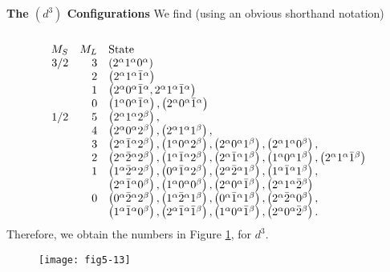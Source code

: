 {\bf The $(d^3)$ Configurations}
We find (using an obvious shorthand notation)
\begin{equation}
\begin{array}{rrl}\\
M_S & M_L & \mathrm{State} \\
3/2 & 3 & \left( 2^{\alpha} 1^{\alpha} 0^{\alpha} \right)\cr
& 2 & \left( 2^{\alpha} 1^{\alpha} {\bar{1}}^{\alpha} \right)\cr
& 1 & \left( 2^{\alpha} 0^{\alpha} {\bar{1}}^{\alpha} , 2^{\alpha} 
1^{\alpha} {\bar{1}}^{\alpha} \right)\cr
& 0 & \left( 1^{\alpha} 0^{\alpha} {\bar{1}}^{\alpha} \right) , 
\left( 2^{\alpha} 0^{\alpha} {\bar{1}}^{\alpha} \right)\cr

1/2 & 5 & \left( 2^{\alpha} 1^{\alpha} 2^{\beta} \right),\cr
& 4 & \left( 2^{\alpha} 0^{\alpha} 2^{\beta} \right) , 
\left( 2^{\alpha} 1^{\alpha} 1^{\beta} \right),\cr
& 3 & \left( 2^{\alpha} {\bar 1}^{\alpha} 2^{\beta} \right) , 
\left( 1^{\alpha} 0^{\alpha} 2^{\beta} \right), 
\left( 2^{\alpha} 0^{\alpha} 1^{\beta} \right), 
\left( 2^{\alpha} 1^{\alpha} 0^{\beta} \right) ,\cr
& 2 & \left( 2^{\alpha} {\bar 2}^{\alpha} 2^{\beta} \right) , 
\left( 1^{\alpha} {\bar 1}^{\alpha} 2^{\beta} \right) , 
\left( 2^{\alpha} {\bar 1}^{\alpha} 1^{\beta} \right) , 
\left( 1^{\alpha} 0^{\alpha} 1^{\beta} \right) , 
\left( 2^{\alpha} 1^{\alpha} {\bar 1}^{\beta} \right)\cr
& 1 & \left( 1^{\alpha} {\bar 2}^{\alpha} 2^{\beta} \right) , 
\left( 0^{\alpha} {\bar 1}^{\alpha} 2^{\beta} \right) , 
\left( 2^{\alpha} {\bar 2}^{\alpha} 1^{\beta} \right) , 
\left( 1^{\alpha} {\bar 1}^{\alpha} 1^{\beta} \right) ,\cr
&& \left( 2^{\alpha} {\bar 1}^{\alpha} 0^{\beta} \right) , 
\left( 1^{\alpha} 0^{\alpha} 0^{\beta} \right) , 
\left( 2^{\alpha} 0^{\alpha} {\bar 1}^{\beta} \right) , 
\left( 2^{\alpha} 1^{\alpha} {\bar 2}^{\beta} \right)\cr
& 0 & \left( 0^{\alpha} {\bar 2}^{\alpha} 2^{\beta} \right) , 
\left( 1^{\alpha} {\bar 2}^{\alpha} 1^{\beta} \right) , 
\left( 0^{\alpha} {\bar 1}^{\alpha} 1^{\beta} \right) , 
\left( 2^{\alpha} {\bar 2}^{\alpha} 0^{\beta} \right) ,\cr
&& \left( 1^{\alpha} {\bar 1}^{\alpha} 0^{\beta} \right) , 
\left( 2^{\alpha} {\bar 1}^{\alpha} {\bar 1}^{\beta} \right) , 
\left( 1^{\alpha} 0^{\alpha} {\bar 1}^{\beta} \right) , 
\left( 2^{\alpha} 0^{\alpha} {\bar 2}^{\beta} \right).\cr
\end{array}
\end{equation}
Therefore, we obtain the numbers in Figure \ref{fig5-a-2}, for $d^3$.

\begin{figure}
\texttt{[image: fig5-13]}
\caption{}
\label{fig5-a-2}
\end{figure}

